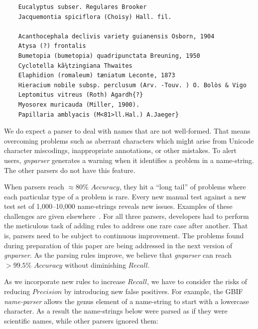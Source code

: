 \documentclass{bmcart}
\makeatletter
\newcommand{\verbatimfont}[1]{\def\verbatim@font{#1}}%
\makeatother
\begin{document}
\vspace{0.5cm}

\verbatimfont{\bfseries\rmfamily\small}

\begin{verbatim}
    Eucalyptus subser. Regulares Brooker
    Jacquemontia spiciflora (Choisy) Hall. fil.

    Acanthocephala declivis variety guianensis Osborn, 1904
    Atysa (?) frontalis
    Bumetopia (bumetopia) quadripunctata Breuning, 1950
    Cyclotella kã¼tzingiana Thwaites
    Elaphidion (romaleum) tæniatum Leconte, 1873
    Hieracium nobile subsp. perclusum (Arv. -Touv. ) O. Bolòs & Vigo
    Leptomitus vitreus (Roth) Agardh{?}
    Myosorex muricauda (Miller, 1900).
    Papillaria amblyacis (M<81>ll.Hal.) A.Jaeger}
\end{verbatim}

\vspace{0.5cm}

We do expect a parser to deal with names that are not well-formed. That means overcoming problems such as aberrant characters which might arise from Unicode character miscodings, inappropriate annotations, or other mistakes. To alert users, \textit{gnparser} generates a warning when it identifies a problem in a name-string. The other parsers do not have this feature.

When parsers reach $\approx80\%$ $Accuracy$, they hit a ``long tail'' of problems where each particular type of a problem is rare. Every new manual test against a new test set of 1,000--10,000 name-strings reveals new issues.  Examples of these challenges are given elsewhere~\cite{Patterson2016}.  For all three parsers, developers had to perform the meticulous task of adding rules to address one rare case after another. That is, parsers need to be subject to continuous improvement. The problems found during preparation of this paper are being addressed in the next version of \textit{gnparser}. As the parsing rules improve, we believe that \textit{gnparser} can reach $>99.5\%$ $Accuracy$ without diminishing $Recall$.

As we incorporate new rules to increase $Recall$, we have to consider the risks of reducing $Precision$ by introducing new false positives. For example, the GBIF \textit{name-parser} allows the genus element of a name-string to start with a lowercase character. As a result the name-strings below were parsed as if they were scientific names, while other parsers ignored them:

\vspace{0.5cm}
\end{document}
